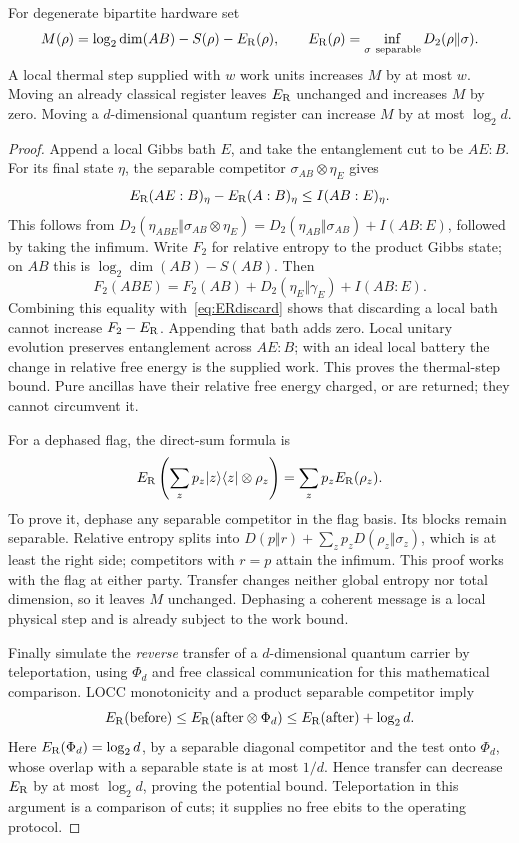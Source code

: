 \begin{lemma}\label{lem:potential}
For degenerate bipartite hardware set
\[
 M(\rho)=\log_2\dim(AB)-S(\rho)-E_{\mathrm R}(\rho),\qquad
 E_{\mathrm R}(\rho)=\inf_{\sigma\ {\rm separable}}D_2(\rho\Vert\sigma).
\]
A local thermal step supplied with $w$ work units increases $M$ by at most $w$. Moving an already classical register leaves $E_{\mathrm R}$ unchanged and increases $M$ by zero. Moving a $d$-dimensional quantum register can increase $M$ by at most $\log_2d$.
\end{lemma}
\begin{proof}
Append a local Gibbs bath $E$, and take the entanglement cut to be $AE:B$. For its final state $\eta$, the separable competitor $\sigma_{AB}\otimes\eta_E$ gives
\begin{equation}
 E_{\mathrm R}(AE:B)_\eta-E_{\mathrm R}(A:B)_\eta\le I(AB:E)_\eta.\label{eq:ERdiscard}
\end{equation}
This follows from
$D_2(\eta_{ABE}\Vert\sigma_{AB}\otimes\eta_E)
=D_2(\eta_{AB}\Vert\sigma_{AB})+I(AB:E)$,
followed by taking the infimum. Write $F_2$ for relative entropy to the product Gibbs state; on $AB$ this is $\log_2\dim(AB)-S(AB)$. Then
\[
 F_2(ABE)=F_2(AB)+D_2(\eta_E\Vert\gamma_E)+I(AB:E).
\]
Combining this equality with~\eqref{eq:ERdiscard} shows that discarding a local bath cannot increase $F_2-E_{\mathrm R}$. Appending that bath adds zero. Local unitary evolution preserves entanglement across $AE:B$; with an ideal local battery the change in relative free energy is the supplied work. This proves the thermal-step bound. Pure ancillas have their relative free energy charged, or are returned; they cannot circumvent it.

For a dephased flag, the direct-sum formula is
\[
 E_{\mathrm R}\left(\sum_zp_z|z\rangle\langle z|\otimes\rho_z\right)
       =\sum_zp_zE_{\mathrm R}(\rho_z).
\]
To prove it, dephase any separable competitor in the flag basis. Its blocks remain separable. Relative entropy splits into $D(p\Vert r)+\sum_zp_zD(\rho_z\Vert\sigma_z)$, which is at least the right side; competitors with $r=p$ attain the infimum. This proof works with the flag at either party. Transfer changes neither global entropy nor total dimension, so it leaves $M$ unchanged. Dephasing a coherent message is a local physical step and is already subject to the work bound.

Finally simulate the \emph{reverse} transfer of a $d$-dimensional quantum carrier by teleportation, using $\Phi_d$ and free classical communication for this mathematical comparison. LOCC monotonicity and a product separable competitor imply
\[
 E_{\mathrm R}({\rm before})\le E_{\mathrm R}({\rm after}\otimes\Phi_d)
 \le E_{\mathrm R}({\rm after})+\log_2d.
\]
Here $E_{\mathrm R}(\Phi_d)=\log_2d$, by a separable diagonal competitor and the test onto $\Phi_d$, whose overlap with a separable state is at most $1/d$. Hence transfer can decrease $E_{\mathrm R}$ by at most $\log_2d$, proving the potential bound. Teleportation in this argument is a comparison of cuts; it supplies no free ebits to the operating protocol.
\end{proof}

